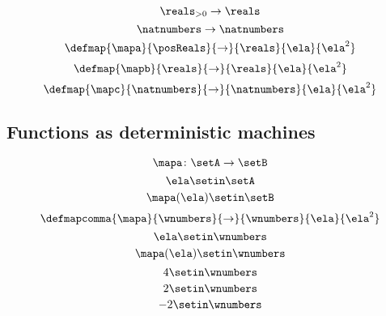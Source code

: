 \begin{forslides}
\begin{equation}
        \reals_{> 0} \to \reals
    \end{equation}
    \begin{equation}\label{eq:slides_session2_89}
        \natnumbers \to \natnumbers
    \end{equation}
    \begin{equation}\label{eq:slides_session2_90}
        \defmap{\mapa}{\posReals}{\to}{\reals}{\ela}{\ela^2}
    \end{equation}
    \begin{equation}\label{eq:slides_session2_91}
        \defmap{\mapb}{\reals}{\to}{\reals}{\ela}{\ela^2}
    \end{equation}
    \begin{equation}\label{eq:slides_session2_92}
        \defmap{\mapc}{\natnumbers}{\to}{\natnumbers}{\ela}{\ela^2}
    \end{equation}

    \subsection{Functions as deterministic machines}

    \begin{equation}\label{eq:slides_session2_94}
        \mapa\colon \setA \to \setB
    \end{equation}
    \begin{equation}\label{eq:slides_session2_95}
        \ela \setin\setA
    \end{equation}
    \begin{equation}\label{eq:slides_session2_96}
        \mapa(\ela) \setin\setB
    \end{equation}
    \begin{equation}\label{eq:slides_session2_97}
        \defmapcomma{\mapa}{\wnumbers}{\to}{\wnumbers}{\ela}{\ela^2}
    \end{equation}
    \begin{equation}\label{eq:slides_session2_98}
        \ela \setin\wnumbers
    \end{equation}
    \begin{equation}\label{eq:slides_session2_99}
        \mapa(\ela) \setin\wnumbers
    \end{equation}
    \begin{equation}\label{eq:slides_session2_100}
        4 \setin\wnumbers
    \end{equation}
    \begin{equation}\label{eq:slides_session2_101}
        2 \setin\wnumbers
    \end{equation}
    \begin{equation}\label{eq:slides_session2_102}
        -2 \setin\wnumbers
    \end{equation}


\end{forslides}
